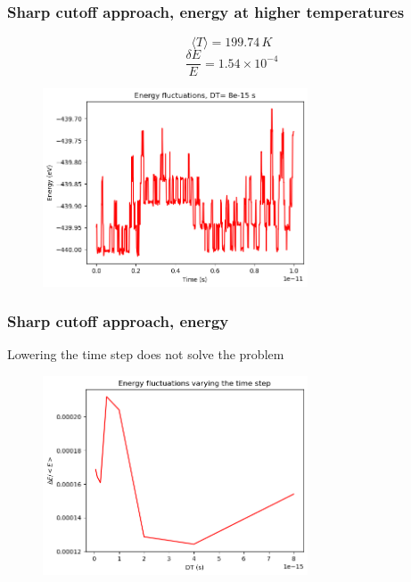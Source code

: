 \documentclass{beamer}
\begin{document}
\begin{frame}
    \frametitle{Sharp cutoff approach, energy at higher temperatures}

    $$\langle T \rangle = 199.74\,K $$
    $$\frac{\delta E }{E}=1.54 \times 10^{-4}   $$

    \begin{figure}
        \includegraphics[width=0.7\textwidth]{images/awfulenergy.png}
    \end{figure}

\end{frame}

\begin{frame}
    \frametitle{Sharp cutoff approach, energy}

    \begin{center}
        Lowering the time step does not solve the problem
    \end{center}

    \begin{figure}
        \includegraphics[width=0.7\textwidth]{images/lowertimestepawful.png}
    \end{figure}

\end{frame}
\end{document}

